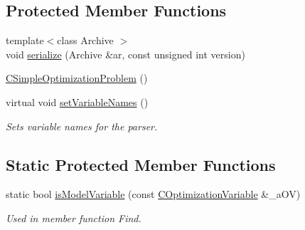 \subsection*{Protected Member Functions}
\begin{DoxyCompactItemize}
\item 
{\footnotesize template$<$class Archive $>$ }\\void \hyperlink{class_go_s_u_m_1_1_c_simple_optimization_problem_a627c6cfdc256739e723cbdbf1a61c007}{serialize} (Archive \&ar, const unsigned int version)
\item 
\hyperlink{class_go_s_u_m_1_1_c_simple_optimization_problem_adb4bce3597cb1920de36cc0d9f009a1b}{C\-Simple\-Optimization\-Problem} ()
\item 
virtual void \hyperlink{class_go_s_u_m_1_1_c_simple_optimization_problem_a051a218199a044cd97ba46a1cf9175f7}{set\-Variable\-Names} ()
\begin{DoxyCompactList}\small\item\em Sets variable names for the parser. \end{DoxyCompactList}\end{DoxyCompactItemize}
\subsection*{Static Protected Member Functions}
\begin{DoxyCompactItemize}
\item 
static bool \hyperlink{class_go_s_u_m_1_1_c_simple_optimization_problem_a87fbc6696a3a066a41b775b79500b78c}{is\-Model\-Variable} (const \hyperlink{class_c_optimization_variable}{C\-Optimization\-Variable} \&\-\_\-a\-O\-V)
\begin{DoxyCompactList}\small\item\em Used in member function Find. \end{DoxyCompactList}\end{DoxyCompactItemize}

